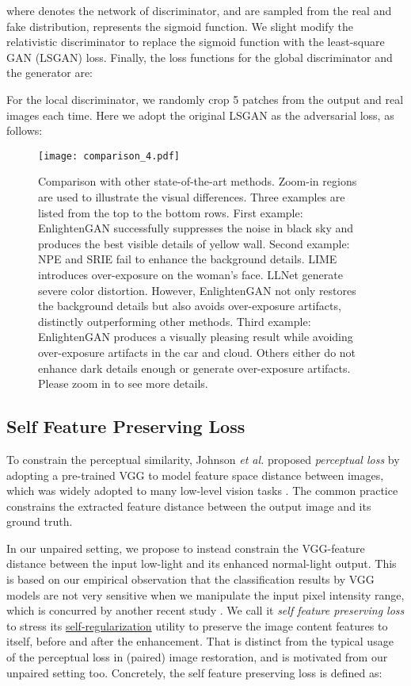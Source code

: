 \documentclass[journal]{IEEEtran}
\begin{document}
where  denotes the network of discriminator,  and  are sampled from the real and fake distribution,  represents the sigmoid function. We slight modify the relativistic discriminator to replace the sigmoid function with the least-square GAN (LSGAN) \cite{mao2017least} loss. 
Finally, the loss functions for the global discriminator  and the generator  are:


For the local discriminator, we randomly crop 5 patches from the output and real images each time. Here we adopt the original LSGAN as the adversarial loss, as follows:




\begin{figure*}[!ht]
\centering
\texttt{[image: comparison\_4.pdf]}
\caption{Comparison with other state-of-the-art methods. Zoom-in regions are used to illustrate the visual differences. Three examples are listed from the top to the bottom rows. First example: EnlightenGAN successfully suppresses the noise in black sky and produces the best visible details of yellow wall. Second example: NPE and SRIE fail to enhance the background details. LIME introduces over-exposure on the woman's face. LLNet generate severe color distortion. However, EnlightenGAN not only restores the background details but also avoids over-exposure artifacts, distinctly outperforming other methods. Third example: EnlightenGAN produces a visually pleasing result while avoiding over-exposure artifacts in the car and cloud. Others either do not enhance dark details enough or generate over-exposure artifacts. Please zoom in to see more details.}
\label{fig:comparison}
\end{figure*}


\subsection{Self Feature Preserving Loss}
To constrain the perceptual similarity, Johnson \textit{et al.} \cite{johnson2016perceptual} proposed \textit{perceptual loss} by adopting a pre-trained VGG to model feature space distance between images, which was widely adopted to many low-level vision tasks \cite{ledig2017photo,kupyn2017deblurgan}. The common practice constrains the extracted feature distance between the output image and its ground truth. 

In our unpaired setting, we propose to instead constrain the VGG-feature distance between the input low-light and its enhanced normal-light output. This is based on our empirical observation that the classification results by VGG models are not very sensitive when we manipulate the input pixel intensity range, which is concurred by another recent study \cite{richardwebster2018psyphy}. We call it \textit{self feature preserving loss} to stress its \underline{self-regularization} utility to preserve the image content features to itself, before and after the enhancement. That is distinct from the typical usage of the perceptual loss in (paired) image restoration, and is motivated from our unpaired setting too.
Concretely, the self feature preserving loss  is defined as:
\end{document}
